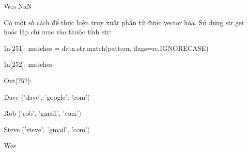 \hspace{1cm}Wes NaN \par
Có một số cách để thực hiện truy xuất phần tử được vector hóa. Sử dụng str.get hoặc lập chỉ mục vào thuộc tính str: \par
\hspace{1cm}In\hspace{3mm}[251]:\hspace{3mm} matches = data.str.match(pattern, flags=re.IGNORECASE)\par
\hspace{1cm}In\hspace{3mm}[252]:\hspace{3mm} matches\par
\hspace{1cm}Out[252]:\par
\hspace{1cm}Dave ('dave', 'google', 'com')\par
\hspace{1cm}Rob ('rob', 'gmail', 'com')\par
\hspace{1cm}Steve ('steve', 'gmail', 'com')\par
\hspace{1cm}Wes \par
